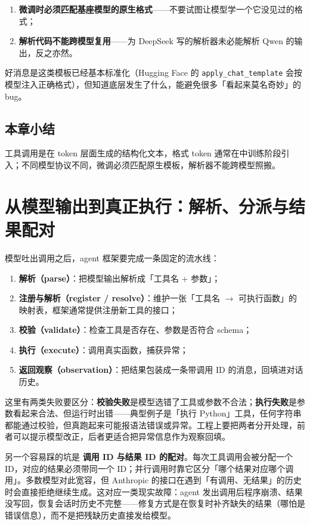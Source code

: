 \documentclass[a4paper]{article}
\begin{document}
\begin{enumerate}
\item \textbf{微调时必须匹配基座模型的原生格式}——不要试图让模型学一个它没见过的格式；
\item \textbf{解析代码不能跨模型复用}——为 DeepSeek 写的解析器未必能解析 Qwen 的输出，反之亦然。
\end{enumerate}

好消息是这类模板已经基本标准化（Hugging Face 的 \texttt{apply\_chat\_template} 会按模型注入正确格式），但知道底层发生了什么，能避免很多「看起来莫名奇妙」的 bug。

\subsection{本章小结}
工具调用是在 token 层面生成的结构化文本，格式 token 通常在中训练阶段引入；不同模型协议不同，微调必须匹配原生模板，解析器不能跨模型照搬。

\section{从模型输出到真正执行：解析、分派与结果配对}

模型吐出调用之后，agent 框架要完成一条固定的流水线：

\begin{enumerate}
\item \textbf{解析（parse）}：把模型输出解析成「工具名 + 参数」；
\item \textbf{注册与解析（register / resolve）}：维护一张「工具名 $\rightarrow$ 可执行函数」的映射表，框架通常提供注册新工具的接口；
\item \textbf{校验（validate）}：检查工具是否存在、参数是否符合 schema；
\item \textbf{执行（execute）}：调用真实函数，捕获异常；
\item \textbf{返回观察（observation）}：把结果包装成一条带调用 ID 的消息，回填进对话历史。
\end{enumerate}

这里有两类失败要区分：\textbf{校验失败}是模型选错了工具或参数不合法；\textbf{执行失败}是参数看起来合法、但运行时出错——典型例子是「执行 Python」工具，任何字符串都能通过校验，但真跑起来可能报语法错误或异常。工程上要把两者分开处理，前者可以提示模型改正，后者更适合把异常信息作为观察回填。

另一个容易踩的坑是 \textbf{调用 ID 与结果 ID 的配对}。每次工具调用会被分配一个 ID，对应的结果必须带同一个 ID；并行调用时靠它区分「哪个结果对应哪个调用」。多数模型对此宽容，但 Anthropic 的接口在遇到「有调用、无结果」的历史时会直接拒绝继续生成。这对应一类现实故障：agent 发出调用后程序崩溃、结果没写回，恢复会话时历史不完整——修复方式是在恢复时补齐缺失的结果（哪怕是错误信息），而不是把残缺历史直接发给模型。
\end{document}
